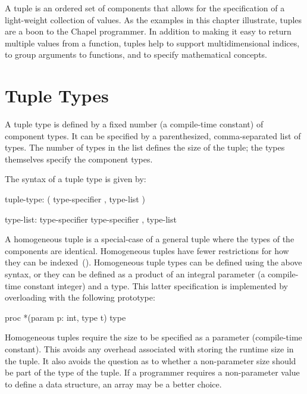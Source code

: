 \label{Tuples}

A tuple is an ordered set of components that allows for the
specification of a light-weight collection of values.  As the examples
in this chapter illustrate, tuples are a boon to the Chapel
programmer.  In addition to making it easy to return multiple values
from a function, tuples help to support multidimensional indices, to
group arguments to functions, and to specify mathematical concepts.

\section{Tuple Types}
\label{Tuple_Types}

A tuple type is defined by a fixed number (a compile-time constant) of
component types.  It can be specified by a parenthesized,
comma-separated list of types.  The number of types in the list
defines the size of the tuple; the types themselves specify the
component types.

The syntax of a tuple type is given by:
\begin{syntax}
tuple-type:
  ( type-specifier , type-list )

type-list:
  type-specifier
  type-specifier , type-list
\end{syntax}

A homogeneous tuple is a special-case of a general tuple where the
types of the components are identical.  Homogeneous tuples have fewer
restrictions for how they can be indexed~().
Homogeneous tuple types can be defined using the above syntax, or they
can be defined as a product of an integral parameter (a compile-time
constant integer) and a type.  This latter specification is
implemented by overloading \chpl{*} with the following prototype:
\begin{chapel}
proc *(param p: int, type t) type
\end{chapel}

\begin{rationale}
Homogeneous tuples require the size to be specified as a parameter
(compile-time constant).  This avoids any overhead associated with
storing the runtime size in the tuple.  It also avoids the question as
to whether a non-parameter size should be part of the type of the
tuple.  If a programmer requires a non-parameter value to define a
data structure, an array may be a better choice.
\end{rationale}

